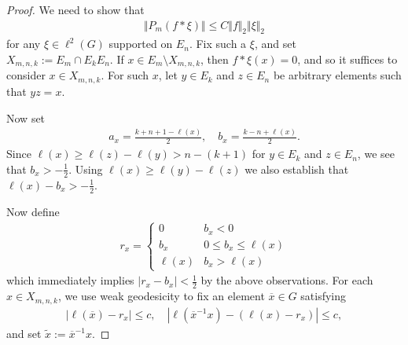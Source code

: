 \documentclass[12pt,a4paper,oneside,final,reqno]{amsart}
\theoremstyle{plain}
\theoremstyle{definition}
\begin{document}
\begin{proof}
    We need to show that
    \begin{align*}
        \Vert P_m(f * \xi) \Vert \leq C \Vert f\Vert_2 \Vert \xi \Vert_2
    \end{align*}
    for any $\xi \in \ell^2(G)$  supported on $E_n$. Fix such a $\xi$, and set $X_{m,n,k} := E_m \cap E_kE_n$. If $x \in E_m \setminus X_{m,n,k}$, then $f*\xi(x) = 0$, and so it suffices to consider $x \in X_{m,n,k}$. For such $x$, let $y \in E_k$ and $z \in E_n$ be arbitrary elements such that $yz = x$. 

    Now set
    \begin{align*}
        a_x = \frac{k+n+1 - \ell(x)}{2} , \quad b_x = \frac{k-n +\ell(x)}{2} .
    \end{align*}
     Since $\ell(x) \geq \ell(z) - \ell(y) > n - (k+1)$ for $y \in E_k$ and $z \in E_n$, we see that $b_x > -\frac{1}{2}$. 
    Using $\ell(x) \geq \ell(y) - \ell(z)$ we also establish that $\ell(x) - b_x > -\frac{1}{2}$. 
    
    Now define
    \begin{align*}
        r_x = \begin{cases}
            0 & b_x < 0 \\
            b_x & 0\leq b_x \leq \ell(x) \\
            \ell(x) & b_x > \ell(x)
        \end{cases}
    \end{align*}
    which immediately implies $|r_x - b_x| < \frac{1}{2}$ by the above observations. 
    For each $x \in X_{m,n,k}$, we use weak geodesicity to fix an element $\overline{x} \in G$ satisfying 
    \begin{align*}
        |\ell(\overline{x}) - r_x | \leq c, \quad | \ell(\overline{x}^{-1}x) - (\ell(x) - r_x)| \leq c,
    \end{align*}
    and set $\tilde{x} := \overline{x}^{-1}x$.


\end{proof}
\end{document}
